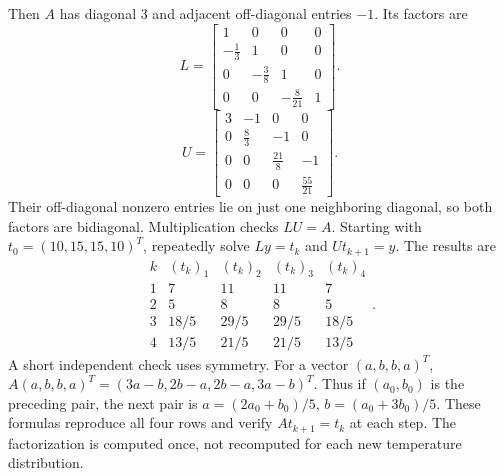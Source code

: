 Then $A$ has diagonal $3$ and adjacent off-diagonal entries $-1$.
Its factors are
\[L=\left[\begin{matrix}1 & 0 & 0 & 0\\- \frac{1}{3} & 1 & 0 & 0\\0 & - \frac{3}{8} & 1 & 0\\0 & 0 & - \frac{8}{21} & 1\end{matrix}\right].\]
\[U=\left[\begin{matrix}3 & -1 & 0 & 0\\0 & \frac{8}{3} & -1 & 0\\0 & 0 & \frac{21}{8} & -1\\0 & 0 & 0 & \frac{55}{21}\end{matrix}\right].\]
Their off-diagonal nonzero entries lie on just one neighboring diagonal,
so both factors are bidiagonal. Multiplication checks $LU=A$.
Starting with $t_0=(10,15,15,10)^T$, repeatedly solve
$Ly=t_k$ and $Ut_{k+1}=y$. The results are
\[\begin{array}{c|rrrr}
k&(t_k)_1&(t_k)_2&(t_k)_3&(t_k)_4\\\hline
1&7&11&11&7\\2&5&8&8&5\\
3&18/5&29/5&29/5&18/5\\4&13/5&21/5&21/5&13/5
\end{array}.\]
A short independent check uses symmetry. For a vector $(a,b,b,a)^T$,
$A(a,b,b,a)^T=(3a-b,2b-a,2b-a,3a-b)^T$.
Thus if $(a_0,b_0)$ is the preceding pair, the next pair is
$a=(2a_0+b_0)/5$, $b=(a_0+3b_0)/5$.
These formulas reproduce all four rows and verify
$At_{k+1}=t_k$ at each step. The factorization is computed once,
not recomputed for each new temperature distribution.

